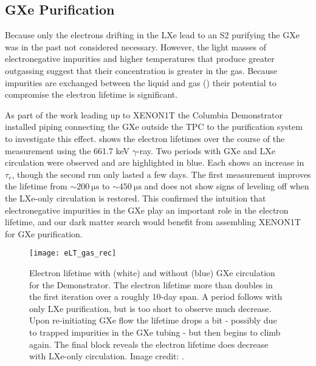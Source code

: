 \subsection{GXe Purification}
\label{subsec:electron_lifetime_model_gxe}
Because only the electrons drifting in the LXe lead to an S2 purifying the GXe was in the past not considered necessary.  However,
the light masses of electronegative impurities and higher temperatures that produce greater outgassing
suggest that their concentration is greater in the gas.  Because
impurities are exchanged between the liquid and gas () their potential to compromise
the electron lifetime is significant.

As part of the work leading up to XENON1T the Columbia Demonstrator installed piping connecting the GXe outside the TPC to the
purification system to investigate this effect.   shows the electron lifetimes over
the course of the measurement using the 661.7 keV  $\gamma$-ray.  Two periods with GXe and LXe circulation were observed and
are highlighted in blue.  Each shows an increase in
$\tau_e$, though the second run only lasted a few days.  The first measurement improves the lifetime from
${\sim} 200\ \mathrm{\mu s}$ to ${\sim} 450\ \mathrm{\mu s}$ and does not show signs of leveling off when the LXe-only circulation is
restored.  This confirmed the intuition that electronegative impurities in the GXe play an important role in the electron
lifetime, and our dark matter search would benefit from assembling XENON1T for GXe purification.

\begin{figure}
\centering
\texttt{[image: eLT\_gas\_rec]}
\caption{Electron lifetime with (white) and without (blue) GXe circulation for the Demonstrator.  The electron lifetime more than doubles
in the first iteration over a roughly 10-day span.  A period follows with
only LXe purification, but is too short to observe much decrease.  Upon re-initiating GXe flow the lifetime drops a bit - possibly due to
trapped impurities in the GXe tubing - but then begins to climb again.  The final block reveals the electron lifetime does
decrease with LXe-only circulation.  Image credit: .}
\label{fig:electron_lifetime_model_gxe_demonstrator}
\end{figure}

